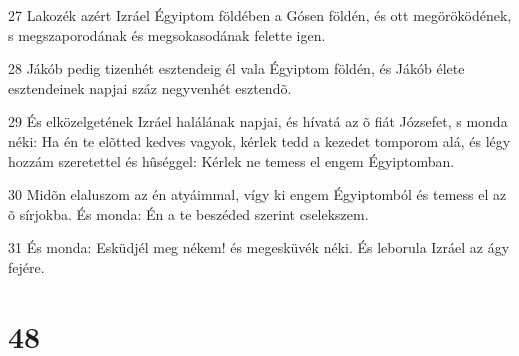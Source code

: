 \par 27 Lakozék azért Izráel Égyiptom földében a Gósen földén, és ott megöröködének, s megszaporodának és megsokasodának felette igen.
\par 28 Jákób pedig tizenhét esztendeig él vala Égyiptom földén, és Jákób élete esztendeinek napjai száz negyvenhét esztendõ.
\par 29 És elközelgetének Izráel halálának napjai, és hívatá az õ fiát Józsefet, s monda néki: Ha én te elõtted kedves vagyok, kérlek tedd a kezedet tomporom alá, és légy hozzám szeretettel és hûséggel: Kérlek ne temess el engem Égyiptomban.
\par 30 Midõn elaluszom az én atyáimmal, vígy ki engem Égyiptomból és temess el az õ sírjokba. És monda: Én a te beszéded szerint cselekszem.
\par 31 És monda: Esküdjél meg nékem! és megesküvék néki. És leborula Izráel az ágy fejére.

\chapter{48}

